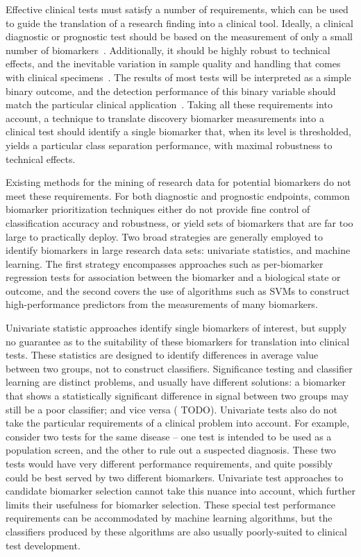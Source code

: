 \documentclass[dissertation.tex]{subfiles}
\begin{document}
Effective clinical tests must satisfy a number of requirements, which can be used to guide the translation of a research finding into a clinical tool.  Ideally, a clinical diagnostic or prognostic test should be based on the measurement of only a small number of biomarkers~\cite{Lesko2001, Pepe2001}.  Additionally, it should be highly robust to technical effects, and the inevitable variation in sample quality and handling that comes with clinical specimens~\cite{Hewitt2008}.  The results of most tests will be interpreted as a simple binary outcome, and the detection performance of this binary variable should match the particular clinical application~\cite{Pepe2001}.  Taking all these requirements into account, a technique to translate discovery biomarker measurements into a clinical test should identify a single biomarker that, when its level is thresholded, yields a particular class separation performance, with maximal robustness to technical effects.

Existing methods for the mining of research data for potential biomarkers do not meet these requirements.  For both diagnostic and prognostic endpoints, common biomarker prioritization techniques either do not provide fine control of classification accuracy and robustness, or yield sets of biomarkers that are far too large to practically deploy.  Two broad strategies are generally employed to identify biomarkers in large research data sets: univariate statistics, and machine learning.  The first strategy encompasses approaches such as per-biomarker regression tests for association between the biomarker and a biological state or outcome, and the second covers the use of algorithms such as \glspl{SVM} to construct high-performance predictors from the measurements of many biomarkers.

Univariate statistic approaches identify single biomarkers of interest, but supply no guarantee as to the suitability of these biomarkers for translation into clinical tests.  These statistics are designed to identify differences in average value between two groups, not to construct classifiers.  Significance testing and classifier learning are distinct problems, and usually have different solutions: a biomarker that shows a statistically significant difference in signal between two groups may still be a poor classifier; and vice versa ( TODO).  Univariate tests also do not take the particular requirements of a clinical problem into account.  For example, consider two tests for the same disease -- one test is intended to be used as a population screen, and the other to rule out a suspected diagnosis.  These two tests would have very different performance requirements, and quite possibly could be best served by two different biomarkers.  Univariate test approaches to candidate biomarker selection cannot take this nuance into account, which further limits their usefulness for biomarker selection.  These special test performance requirements can be accommodated by machine learning algorithms, but the classifiers produced by these algorithms are also usually poorly-suited to clinical test development.
\end{document}
